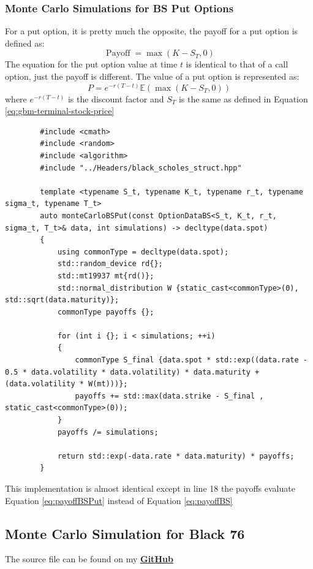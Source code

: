 \documentclass[12pt]{article}
\numberwithin{equation}{section}
\begin{document}
\subsubsection{Monte Carlo Simulations for BS Put Options}
For a put option, it is pretty much the opposite, the payoff for a put option is defined as:
\begin{equation}
	\operatorname{Payoff} = \max(K - S_T, 0)
	\label{eq:payoffBSPut}
\end{equation}
\newline 
The equation for the put option value at time $t$ is identical to that of a call option, just the payoff is different. The value of a put option is represented as: 
\begin{equation}
	P = e^{-r(T-t)} \mathbb{E}(\max(K-S_T, 0))
	\label{putMC}
\end{equation}
where $e^{-r(T-t)}$ is the discount factor and $S_T$ is the same as defined in Equation \ref{eq:gbm-terminal-stock-price}\\
\begin{listing}[H]
	\begin{verbatim}
		#include <cmath>
		#include <random>
		#include <algorithm>
		#include "../Headers/black_scholes_struct.hpp"
		
		template <typename S_t, typename K_t, typename r_t, typename sigma_t, typename T_t>
		auto monteCarloBSPut(const OptionDataBS<S_t, K_t, r_t, sigma_t, T_t>& data, int simulations) -> decltype(data.spot)
		{
			using commonType = decltype(data.spot);
			std::random_device rd{};
			std::mt19937 mt{rd()};
			std::normal_distribution W {static_cast<commonType>(0), std::sqrt(data.maturity)};
			commonType payoffs {};
			
			for (int i {}; i < simulations; ++i)
			{
				commonType S_final {data.spot * std::exp((data.rate - 0.5 * data.volatility * data.volatility) * data.maturity + (data.volatility * W(mt)))};
				payoffs += std::max(data.strike - S_final , static_cast<commonType>(0));
			}
			payoffs /= simulations;
			
			return std::exp(-data.rate * data.maturity) * payoffs;
		}
	\end{verbatim}
	\caption{Black-Scholes Put using Monte Carlo Simulations}
	\label{lst:bsmontecarloPut}
\end{listing}
This implementation is almost identical except in line 18 the payoffs evaluate Equation \ref{eq:payoffBSPut} instead of Equation \ref{eq:payoffBS} 
\newpage
\subsection{Monte Carlo Simulation for Black 76}
The source file can be found on my \href{https://github.com/neeldevsen/pricingengines/blob/main/I%3A%20European%20Options/02_Monte_Carlo/2.2_monte_carlo_simulation_B76.cpp}{\textbf{GitHub}}
\end{document}
